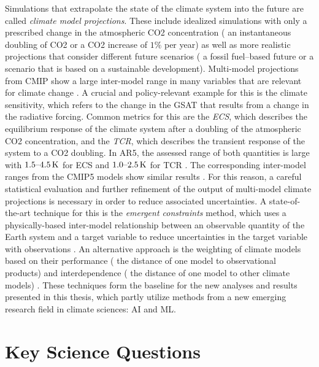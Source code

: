 Simulations that extrapolate the state of the climate system into the future
are called \emph{climate model projections}. These include idealized
simulations with only a prescribed change in the atmospheric \ac{CO2}
concentration (\eg{} an instantaneous doubling of \ac{CO2} or a \ac{CO2}
increase of $1 \unit{\%}$ per year) as well as more realistic projections that
consider different future scenarios (\eg{} a fossil fuel--based future or a
scenario that is based on a sustainable development). Multi-model projections
from \ac{CMIP} show a large inter-model range in many variables that are
relevant for climate change \autocite{Collins2013, Flato2013}. A crucial and
policy-relevant example for this is the climate sensitivity, which refers to
the change in the \ac{GSAT} that results from a change in the radiative
forcing. Common metrics for this are the \emph{\ac{ECS}}, which describes the
equilibrium response of the climate system after a doubling of the atmospheric
\ac{CO2} concentration, and the \emph{\ac{TCR}}, which describes the transient
response of the system to a \ac{CO2} doubling. In \acs{AR}5, the assessed range
of both quantities is large with $\rangeunit{1.5}{4.5}{K}$ for \ac{ECS} and
$\rangeunit{1.0}{2.5}{K}$ for \ac{TCR} \autocite{Stocker2013}. The
corresponding inter-model ranges from the \acs{CMIP}5 models show similar
results \autocite{Flato2013}. For this reason, a careful statistical evaluation
and further refinement of the output of multi-model climate projections is
necessary in order to reduce associated uncertainties. A state-of-the-art
technique for this is the \emph{emergent constraints} method, which uses a
physically-based inter-model relationship between an observable quantity of the
Earth system and a target variable to reduce uncertainties in the target
variable with observations \autocite{Allen2002}. An alternative approach is the
weighting of climate models based on their performance (\ie{} the distance of
one model to observational products) and interdependence (\ie{} the distance of
one model to other climate models) \autocite{Knutti2017a}. These techniques
form the baseline for the new analyses and results presented in this thesis,
which partly utilize methods from a new emerging research field in climate
sciences: \ac{AI} and \ac{ML}.


\section{Key Science Questions}
\label{sec:01:key_science_questions}

